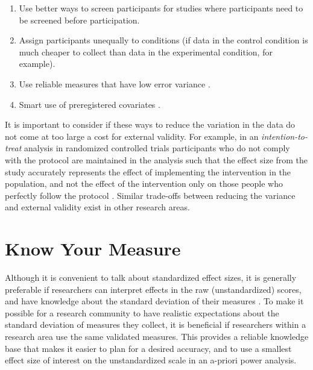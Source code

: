 \documentclass[
]{krantz}
\providecommand{\tightlist}{%
  \setlength{\itemsep}{0pt}\setlength{\parskip}{0pt}}
\begin{document}
\begin{enumerate}
\def\labelenumi{\arabic{enumi}.}
\tightlist
\item
  Use better ways to screen participants for studies where participants need to be screened before participation.
\item
  Assign participants unequally to conditions (if data in the control condition is much cheaper to collect than data in the experimental condition, for example).
\item
  Use reliable measures that have low error variance \citep{williams_impact_1995}.
\item
  Smart use of preregistered covariates \citep{meyvis_increasing_2018}.
\end{enumerate}

It is important to consider if these ways to reduce the variation in the data do not come at too large a cost for external validity. For example, in an \emph{intention-to-treat} analysis in randomized controlled trials participants who do not comply with the protocol are maintained in the analysis such that the effect size from the study accurately represents the effect of implementing the intervention in the population, and not the effect of the intervention only on those people who perfectly follow the protocol \citep{gupta_intention_2011}. Similar trade-offs between reducing the variance and external validity exist in other research areas.

\hypertarget{know-your-measure}{%
\section{Know Your Measure}\label{know-your-measure}}

Although it is convenient to talk about standardized effect sizes, it is generally preferable if researchers can interpret effects in the raw (unstandardized) scores, and have knowledge about the standard deviation of their measures \citep{baguley_standardized_2009, lenth_practical_2001}. To make it possible for a research community to have realistic expectations about the standard deviation of measures they collect, it is beneficial if researchers within a research area use the same validated measures. This provides a reliable knowledge base that makes it easier to plan for a desired accuracy, and to use a smallest effect size of interest on the unstandardized scale in an a-priori power analysis.
\end{document}
